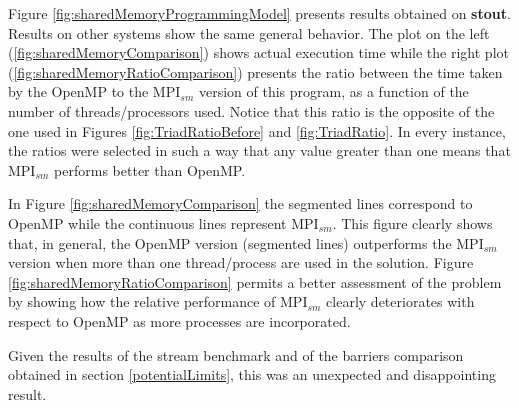 Figure \ref{fig:sharedMemoryProgrammingModel} presents results obtained on \textbf{stout}. Results on other systems show the same general behavior. The plot on the left (\ref{fig:sharedMemoryComparison}) shows actual execution time while the right plot (\ref{fig:sharedMemoryRatioComparison}) presents the ratio between the time taken by the OpenMP to the MPI$_{sm}$ version of this program, as a function of the number of threads/processors used. Notice that this ratio is the opposite of the one used in Figures \ref{fig:TriadRatioBefore} and \ref{fig:TriadRatio}. In every instance, the ratios were selected in such a way that any value greater than one means that MPI$_{sm}$ performs better than OpenMP.

\medskip

In Figure \ref{fig:sharedMemoryComparison} the segmented lines correspond to OpenMP while the continuous lines represent MPI$_{sm}$. This figure clearly shows that, in general, the OpenMP version (segmented lines) outperforms the MPI$_{sm}$ version when more than one thread/process are used in the solution. Figure \ref{fig:sharedMemoryRatioComparison} permits a better assessment of the problem by showing how the relative performance of MPI$_{sm}$ clearly deteriorates with respect to OpenMP as more processes are incorporated.


\medskip

Given the results of the stream benchmark and of the barriers comparison obtained in section \ref{potentialLimits}, this was an unexpected and disappointing result.

